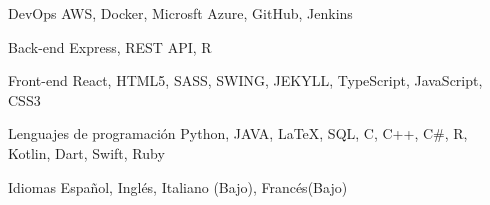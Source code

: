 

\begin{cvskills}

  \cvskill
    {DevOps} %
    {AWS, Docker, Microsft Azure, GitHub, Jenkins} %

  \cvskill
    {Back-end} %
    {Express, REST API, R} %

  \cvskill
    {Front-end} %
    {React, HTML5, SASS, SWING, JEKYLL, TypeScript, JavaScript, CSS3} %

  \cvskill
    {Lenguajes de programación} %
    {Python, JAVA, LaTeX, SQL, C, C++, C\#, R, Kotlin, Dart, Swift, Ruby} %

  \cvskill
    {Idiomas} %
    {Español, Inglés, Italiano (Bajo), Francés(Bajo) } %

\end{cvskills}
